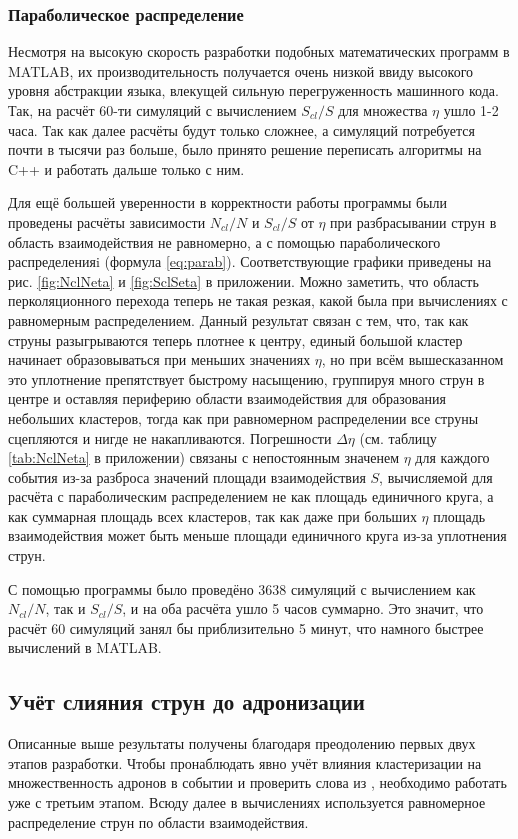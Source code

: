 \subsubsection{Параболическое распределение}
Несмотря на высокую скорость разработки подобных математических программ в MATLAB, их производительность получается очень низкой ввиду высокого уровня абстракции языка, влекущей сильную перегруженность машинного кода. Так, на расчёт 60-ти симуляций с вычислением $S_{cl}/S$ для множества $\eta$ ушло 1-2 часа. Так как далее расчёты будут только сложнее, а симуляций потребуется почти в тысячи раз больше, было принято решение переписать алгоритмы на C++ и работать дальше только с ним.

Для ещё большей уверенности в корректности работы программы были проведены расчёты зависимости $N_{cl}/N$ и $S_{cl}/S$ от $\eta$ при разбрасывании струн в область взаимодействия не равномерно, а с помощью параболического распределенияi (формула \ref{eq:parab}). 
Соответствующие графики приведены на рис. \ref{fig:NclNeta} и \ref{fig:SclSeta} в приложении. 
Можно заметить, что область перколяционного перехода теперь не такая резкая, какой была при вычислениях с равномерным распределением. 
Данный результат связан с тем, что, так как струны разыгрываются теперь плотнее к центру, единый большой кластер начинает образовываться при меньших значениях $\eta$, но при всём вышесказанном это уплотнение препятствует быстрому насыщению, группируя много струн в центре и оставляя периферию области взаимодействия для образования небольших кластеров, тогда как при равномерном распределении все струны сцепляются и нигде не накапливаются.
Погрешности $\Delta \eta$ (см. таблицу \ref{tab:NclNeta} в приложении) связаны с непостоянным значенем $\eta$ для каждого события из-за разброса значений площади взаимодействия $S$, вычисляемой для расчёта с параболическим распределением не как площадь единичного круга, а как суммарная площадь всех кластеров, так как даже при больших $\eta$ площадь взаимодействия может быть меньше площади единичного круга из-за уплотнения струн.

С помощью программы было проведёно 3638 симуляций с вычислением как $N_{cl}/N$, так и $S_{cl}/S$, и на оба расчёта ушло 5 часов суммарно. Это значит, что расчёт 60 симуляций занял бы приблизительно 5 минут, что намного быстрее вычислений в MATLAB. 
\subsection{Учёт слияния струн до адронизации}
Описанные выше результаты получены благодаря преодолению первых двух этапов разработки. 
Чтобы пронаблюдать явно учёт влияния кластеризации на множественность адронов в событии и проверить слова из \cite{MulReduction}, необходимо работать уже с третьим этапом. 
Всюду далее в вычислениях используется равномерное распределение струн по области взаимодействия.

